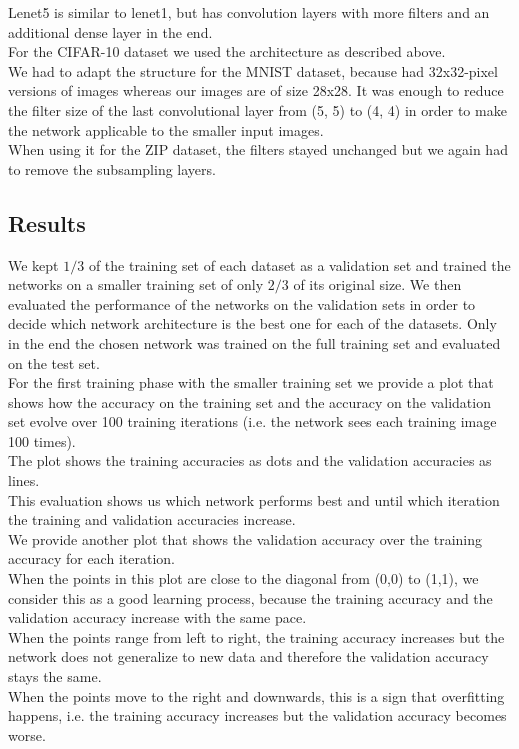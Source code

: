 Lenet5 is similar to lenet1, but has convolution layers with more filters
and an additional dense layer in the end.\\

For the CIFAR-10 dataset we used the architecture as described above.\\
We had to adapt the structure for the MNIST dataset,
because \cite{lecun98} had 32x32-pixel versions of images
whereas our images are of size 28x28.
It was enough to reduce the filter size
of the last convolutional layer from (5, 5) to (4, 4) in order
to make the network applicable to the smaller input images.\\
When using it for the ZIP dataset, the filters stayed unchanged
but we again had to remove the subsampling layers.\\


\subsection{Results}

We kept $1/3$ of the training set of each dataset as a validation set and trained the networks
on a smaller training set of only $2/3$ of its original size.
We then evaluated the performance of the networks on the validation sets in order to decide
which network architecture is the best one for each of the datasets.
Only in the end the chosen network was trained on the full training set and evaluated on the test set.\\

For the first training phase with the smaller training set we provide a plot
that shows how the accuracy on the training set and the accuracy on the validation set evolve over
100 training iterations (i.e. the network sees each training image 100 times).\\
The plot shows the training accuracies as dots and the validation accuracies as lines.\\
This evaluation shows us which network performs best and until which iteration the training and validation accuracies
increase.\\

We provide another plot that shows the validation accuracy over the training accuracy for each iteration.\\
When the points in this plot are close to the diagonal from (0,0) to (1,1), we consider this as a good learning process,
because the training accuracy and the validation accuracy increase with the same pace.\\
When the points range from left to right, the training accuracy increases but the network does not generalize to new data
and therefore the validation accuracy stays the same.\\
When the points move to the right and downwards, this is a sign that overfitting happens,
i.e. the training accuracy increases but the validation accuracy becomes worse.


